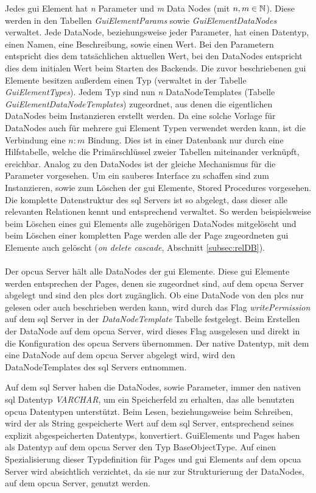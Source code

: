 Jedes \ac{gui} Element hat \emph{n} Parameter und \emph{m} Data Nodes (mit $ n, m \in \mathbb{N} $). 
Diese werden in den Tabellen \emph{GuiElementParams} sowie \emph{GuiElementDataNodes} verwaltet.
Jede DataNode, beziehungsweise jeder Parameter, hat einen Datentyp, einen Namen, eine Beschreibung, sowie einen Wert. 
Bei den Parametern entspricht dies dem tatsächlichen aktuellen Wert, 
bei den DataNodes entspricht dies dem initialen Wert beim Starten des Backends.
Die zuvor beschriebenen \ac{gui} Elemente besitzen außerdem einen Typ (verwaltet in der Tabelle \emph{GuiElementTypes}).
Jedem Typ sind nun \emph{n} DataNodeTemplates (Tabelle \emph{GuiElementDataNodeTemplates}) zugeordnet, 
aus denen die eigentlichen DataNodes beim Instanzieren erstellt werden. Da eine solche Vorlage für DataNodes auch für mehrere \ac{gui} Element Typen verwendet werden kann, 
ist die Verbindung eine $n:m$ Bindung. 
Dies ist in einer Datenbank nur durch eine Hilfstabelle, 
welche die Primärschlüssel zweier Tabellen miteinander verknüpft, ereichbar. 
Analog zu den DataNodes ist der gleiche Mechanismus für die Parameter vorgesehen.
Um ein sauberes Interface zu schaffen sind zum Instanzieren, 
sowie zum Löschen der \ac{gui} Elemente, Stored Procedures vorgesehen.
Die komplette Datenstruktur des \ac{sql} Servers ist so abgelegt, 
dass dieser alle relevanten Relationen kennt und entsprechend verwaltet.
So werden beispielsweise beim Löschen eines \ac{gui} Elements alle zugehörigen DataNodes mitgelöscht und 
beim Löschen einer kompletten Page werden alle der Page zugeordneten \ac{gui} Elemente auch gelöscht (\emph{on delete cascade}, Abschnitt \ref{subsec:relDB}).\\ \\

Der \ac{opcua} Server hält alle DataNodes der \ac{gui} Elemente. 
Diese \ac{gui} Elemente werden entsprechen der Pages, denen sie zugeordnet sind, auf dem \ac{opcua} Server abgelegt und 
sind den \acp{plc} dort zugänglich.
Ob eine DataNode von den \acp{plc} nur gelesen oder auch beschrieben werden kann, 
wird durch das Flag \emph{writePermission} auf dem \ac{sql} Server in der \emph{DataNodeTemplate} Tabelle festgelegt. 
Beim Erstellen der DataNode auf dem \ac{opcua} Server, wird dieses Flag ausgelesen und 
direkt in die Konfiguration des \ac{opcua} Servers übernommen.
Der native Datentyp, mit dem eine DataNode auf dem \ac{opcua} Server abgelegt wird, wird den DataNodeTemplates des \ac{sql} Servers entnommen.

Auf dem \ac{sql} Server haben die DataNodes, sowie Parameter, immer den nativen \ac{sql} Datentyp \emph{VARCHAR}, um ein Speicherfeld zu erhalten, das alle benutzten \ac{opcua} Datentypen unterstützt.
Beim Lesen, beziehungsweise beim Schreiben, wird der als String gespeicherte Wert auf dem \ac{sql} Server, 
entsprechend seines explizit abgespeicherten Datentyps, konvertiert. 
GuiElements und Pages haben als Datentyp auf dem \ac{opcua} Server den Typ BaseObjectType.
Auf einen Spezialisierung dieser Typdefinition für Pages und \ac{gui} Elements auf dem \ac{opcua} Server wird absichtlich verzichtet, 
da sie nur zur Strukturierung der DataNodes, auf dem \ac{opcua} Server, genutzt werden.


